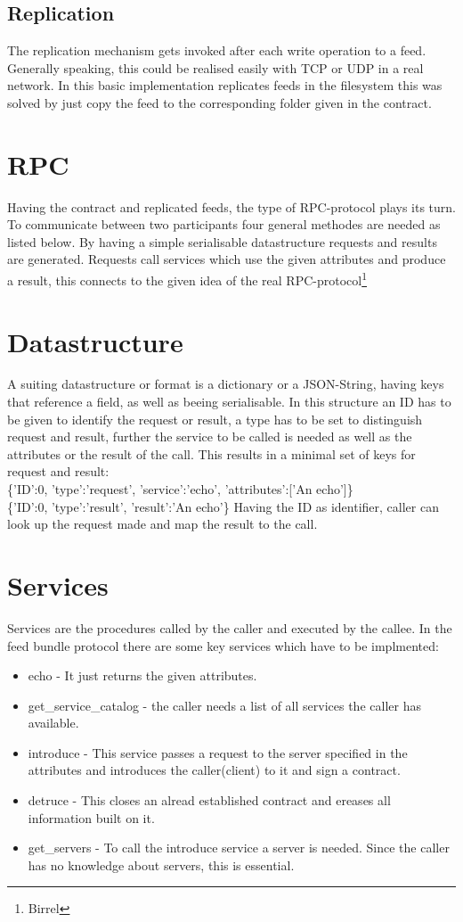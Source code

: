 \subsection{Replication}
The replication mechanism gets invoked after each write operation to a feed. Generally speaking, this could be realised easily with TCP or UDP in a real network. In this basic implementation replicates feeds in the filesystem this was solved by just copy the feed to the corresponding folder given in the contract.
\section{RPC}
Having the contract and replicated feeds, the type of RPC-protocol plays its turn. To communicate between two participants four general methodes are needed as listed below. By having a simple serialisable datastructure requests and results are generated. Requests call services which use the given attributes and produce a result, this connects to the given idea of the real RPC-protocol\footnote{Birrel}
\section{Datastructure}
A suiting datastructure or format is a dictionary or a JSON-String, having keys that reference a field, as well as beeing serialisable. In this structure an ID has to be given to identify the request or result, a type has to be set to distinguish request and result, further the service to be called is needed as well as the attributes or the result of the call. This results in a minimal set of keys for request and result:\\
\{'ID':0, 'type':'request', 'service':'echo', 'attributes':['An echo']\}\\
\{'ID':0, 'type':'result', 'result':'An echo'\}
Having the ID as identifier, caller can look up the request made and map the result to the call.
\section{Services}
Services are the procedures called by the caller and executed by the callee. In the feed bundle protocol there are some key services which have to be implmented:
\begin{itemize}
    \item echo - It just returns the given attributes.
    \item get\_service\_catalog - the caller needs a list of all services the caller has available.
    \item introduce - This service passes a request to the server specified in the attributes and introduces the caller(client) to it and sign a contract.
    \item detruce - This closes an alread established contract and ereases all information built on it.
    \item get\_servers - To call the introduce service a server is needed. Since the caller has no knowledge about servers, this is essential.
\end{itemize}
